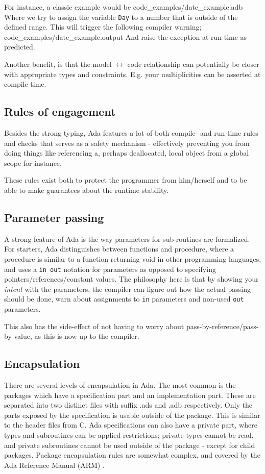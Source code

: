 \documentclass[10pt,a4paper]{article}
\def\File#1{\textsf{#1}}
\def\Code#1{\texttt{#1}}
\begin{document}
For instance, a classic example would be
 {code_examples/date_example.adb}
Where we try to assign the variable \Code{Day} to a number that is outside of the defined range. This will trigger the following compiler warning;
 {code_examples/date_example.output}
And raise the exception at run-time as predicted.

Another benefit, is that the model $\leftrightarrow$ code relationship can potentially be closer with appropriate types and constraints. E.g. your multiplicities can be asserted at compile time.

\subsection{Rules of engagement}
Besides the strong typing, Ada features a lot of both compile- and run-time rules and checks that serves as a safety mechanism - effectively preventing you from doing things like referencing a, perhaps deallocated, local object from a global scope for instance.

These rules exist both to protect the programmer from him/herself and to be able to make guarantees about the runtime stability.

\subsection{Parameter passing}
A strong feature of Ada is the way parameters for sub-routines are formalized. For starters, Ada distinguishes between functions and procedure, where a procedure is similar to a function returning void in other programming languages, and uses a \Code{in out} notation for parameters as opposed to specifying pointers/references/constant values. The philosophy here is that by showing your \emph{intent} with the parameters, the compiler can figure out how the actual passing should be done, warn about assignments to \Code{in} parameters and non-used \Code{out} parameters.

This also has the side-effect of not having to worry about pass-by-reference/pass-by-value, as this is now up to the compiler.

\subsection{Encapsulation}
There are several levels of encapsulation in Ada. The most common is the packages which have a specification part and an implementation part. These are separated into two distinct files with suffix \File{.ads} and \File{.adb} respectively. Only the parts exposed by the specification is usable outside of the package. This is similar to the header files from C.
Ada specifications can also have a private part, where types and subroutines can be applied restrictions; private types cannot be read, and private subroutines cannot be used outside of the package - except for child packages.
Package encapsulation rules are somewhat complex, and covered by the Ada Reference Manual (ARM) \cite{taft1997ada}.
\end{document}
